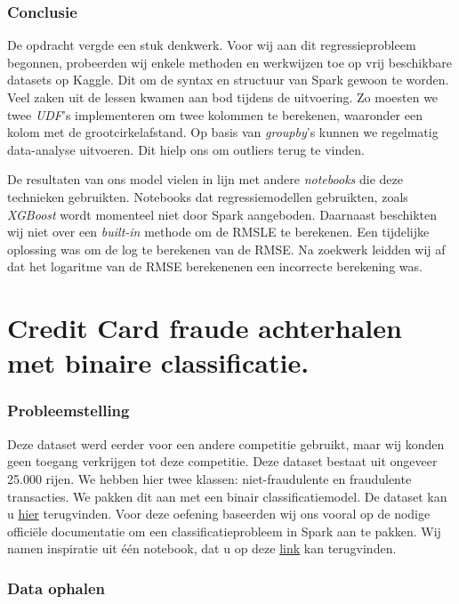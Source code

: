 \documentclass[a4paper,10pt,twoside]{report}
\begin{document}
\subsection*{Conclusie}

De opdracht vergde een stuk denkwerk. Voor wij aan dit regressieprobleem begonnen, probeerden wij enkele methoden en werkwijzen toe op vrij beschikbare datasets op Kaggle. Dit om de syntax en structuur van Spark gewoon te worden. Veel zaken uit de lessen kwamen aan bod tijdens de uitvoering. Zo moesten we twee \textit{UDF}'s implementeren om twee kolommen te berekenen, waaronder een kolom met de grootcirkelafstand. Op basis van \textit{groupby}'s kunnen we regelmatig data-analyse uitvoeren. Dit hielp ons om outliers terug te vinden.

De resultaten van ons model vielen in lijn met andere \textit{notebooks} die deze technieken gebruikten. Notebooks dat regressiemodellen gebruikten, zoals \textit{XGBoost} wordt momenteel niet door Spark aangeboden. Daarnaast beschikten wij niet over een \textit{built-in} methode om de RMSLE te berekenen. Een tijdelijke oplossing was om de log te berekenen van de RMSE. Na zoekwerk leidden wij af dat het logaritme van de RMSE berekenenen een incorrecte berekening was.

\chapter{Credit Card fraude achterhalen met binaire classificatie. }

\subsection*{Probleemstelling}

Deze dataset werd eerder voor een andere competitie gebruikt, maar wij konden geen toegang verkrijgen tot deze competitie. Deze dataset bestaat uit ongeveer 25.000 rijen. We hebben hier twee klassen: niet-fraudulente en fraudulente transacties. We pakken dit aan met een binair classificatiemodel. De dataset kan u \href{http://bit.ly/3iM6zIB}{hier} terugvinden. Voor deze oefening baseerden wij ons vooral op de nodige officiële documentatie om een classificatieprobleem in Spark aan te pakken. Wij namen inspiratie uit één notebook, dat u op deze \href{https://bit.ly/3Y9Kmo6}{link} kan terugvinden.

\subsection*{Data ophalen}
\end{document}
